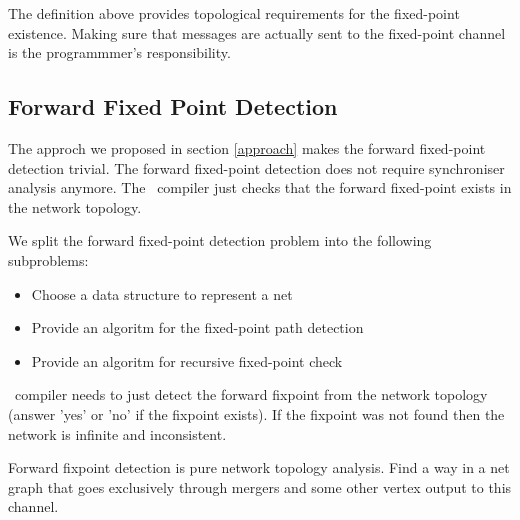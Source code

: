 %

The definition above provides topological requirements for the fixed-point existence. Making sure that messages are actually sent to the fixed-point channel is the programmmer's responsibility.


    \subsection{Forward Fixed Point Detection\label{ffp_detect}}
The approch we proposed in section \ref{approach} makes the forward fixed-point detection trivial. The forward fixed-point detection does not require synchroniser analysis anymore. The \ak\ compiler just checks that the forward fixed-point exists in the network topology.

We split the forward fixed-point detection problem into the following subproblems:
\begin{itemize}
\item Choose a data structure to represent a net
\item Provide an algoritm for the fixed-point path detection
\item Provide an algoritm for recursive fixed-point check
\end{itemize}


\ak\ compiler needs to just detect the forward fixpoint from the network topology (answer 'yes' or 'no' if the fixpoint exists). If the fixpoint was not found then the network is infinite and inconsistent.

Forward fixpoint detection is pure network topology analysis. Find a way in a net graph that goes exclusively through mergers and some other vertex output to this channel.

